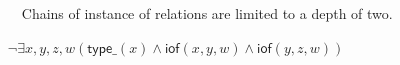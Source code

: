 \documentclass{article}
\newcommand{\AxLabel}{a}
\newcounter{cntax}
\newcommand{\myax}[1]{\refstepcounter{cntax}{\bf \small \AxLabel\thecntax}\label{#1}$\,\,\,\,$}
\begin{document}
\begin{itemize}
    \item[\myax{ax_twoLevelConstrained}] Chains of instance of relations are limited to a depth of two.
    
    $\neg \exists x,y,z,w(\textsf{type\_}(x)\wedge \textsf{iof}(x,y,w)\wedge \textsf{iof}(y,z,w))$

    
\end{itemize}







% 


% 
\end{document}
